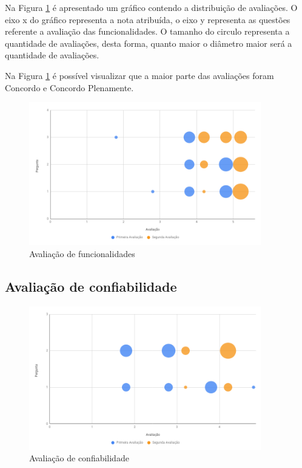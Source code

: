 \documentclass[
	12pt,				%
	oneside,			%
	a4paper,			%
	english,			%
	french,				%
	spanish,			%
	brazil,				%
	]{abntex2}
\begin{document}
Na Figura \ref{fig:avaliacaoFuncionalidades} é apresentado um gráfico contendo a distribuição de avaliações. O eixo x do gráfico representa a nota atribuída, o eixo y representa as questões referente a avaliação das funcionalidades. O tamanho do circulo representa a quantidade de avaliações, desta forma, quanto maior o diâmetro maior será a quantidade de avaliações.

Na Figura \ref{fig:avaliacaoFuncionalidades} é possível visualizar que a maior parte das avaliações foram Concordo e Concordo Plenamente. 

\begin{figure}[H]
\centering
\caption{Avaliação de funcionalidades}\label{fig:avaliacaoFuncionalidades}
\includegraphics[width=0.9\textwidth]{imagens/avaliacao_funcionalidades.png}
\sourceAuthor
\end{figure}

\subsection{Avaliação de confiabilidade}

\begin{figure}[H]
\centering
\caption{Avaliação de confiabilidade}
\includegraphics[width=0.9\textwidth]{imagens/avaliacao_confiabilidade.png}
\sourceAuthor
\end{figure}
\end{document}
